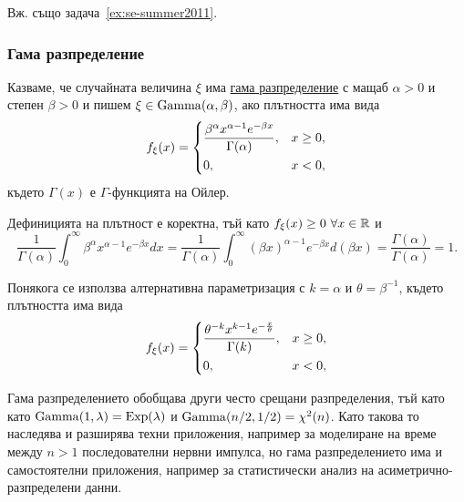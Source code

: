 \documentclass[numbers=endperiod, DIV=15, bibliography=totocnumbered]{scrartcl}
\begin{document}
Вж. също задача~\ref{ex:se-summer2011}.

\subsubsection{Гама разпределение}\label{dist:gamma}

\begin{definition}
  Казваме, че случайната величина $\xi$ има \uline{гама разпределение} с мащаб $\alpha > 0$ и степен $\beta > 0$ и пишем $\xi \in \operatorname{Gamma}(\alpha, \beta)$, ако плътността има вида
  \begin{displaymath}
    f_\xi(x)
    =
    \begin{dcases}
      \frac {\beta^\alpha x^{\alpha-1} e^{-\beta x}} {\Gamma(\alpha)}, &x \geq 0, \\
      0, &x < 0,
    \end{dcases}
  \end{displaymath}
  където $\Gamma(x)$ е $\Gamma$-функцията на Ойлер.

  Дефиницията на плътност е коректна, тъй като $f_\xi(x) \geq 0~\forall x \in \mathbb{R}$ и
  \begin{displaymath}
    \frac 1 {\Gamma(\alpha)} \int_0^\infty {\beta^\alpha x^{\alpha-1} e^{-\beta x}} dx
    =
    \frac 1 {\Gamma(\alpha)} \int_0^\infty {{(\beta x)}^{\alpha-1} e^{-\beta x}} d(\beta x)
    =
    \frac {\Gamma(\alpha)} {\Gamma(\alpha)}
    =
    1.
  \end{displaymath}

  Понякога се използва алтернативна параметризация с $k = \alpha$ и $\theta = \beta^{-1}$, където плътността има вида
  \begin{displaymath}
    f_\xi(x)
    =
    \begin{dcases}
      \frac {\theta^{-k} x^{k-1} e^{-\frac x \theta}} {\Gamma(k)}, &x \geq 0, \\
      0, &x < 0,
    \end{dcases}
  \end{displaymath}
\end{definition}

Гама разпределението обобщава други често срещани разпределения, тъй като като $\operatorname{Gamma}(1, \lambda) = \operatorname{Exp}(\lambda)$ и $\operatorname{Gamma}(n/2, 1/2) = \operatorname{\chi^2}(n)$. Като такова то наследява и разширява техни приложения, например за моделиране на време между $n > 1$ последователни нервни импулса, но гама разпределението има и самостоятелни приложения, например за статистически анализ на асиметрично-разпределени данни.
\end{document}
